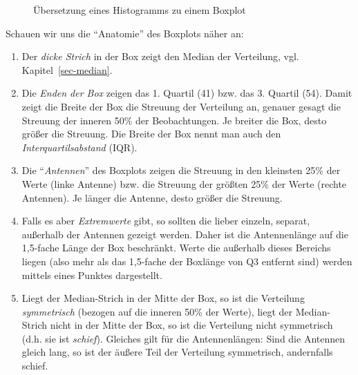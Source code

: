 \documentclass[
  letterpaper,
]{scrbook}
\providecommand{\tightlist}{%
  \setlength{\itemsep}{0pt}\setlength{\parskip}{0pt}}\usepackage{longtable,booktabs,array}
\theoremstyle{definition}
\theoremstyle{definition}
\theoremstyle{definition}
\theoremstyle{remark}
\begin{document}
\begin{figure}[H]


\caption{\label{fig-hist-to-box}Übersetzung eines Histogramms zu einem
Boxplot}

\end{figure}%

Schauen wir uns die \enquote{Anatomie} des Boxplots näher an:

\begin{enumerate}
\def\labelenumi{\arabic{enumi}.}
\tightlist
\item
  Der \emph{dicke Strich} in der Box zeigt den Median der Verteilung,
  vgl. Kapitel~\ref{sec-median}.
\item
  Die \emph{Enden der Box} zeigen das 1. Quartil (41) bzw. das 3.
  Quartil (54). Damit zeigt die Breite der Box die Streuung der
  Verteilung an, genauer gesagt die Streuung der inneren 50\% der
  Beobachtungen. Je breiter die Box, desto größer die Streuung. Die
  Breite der Box nennt man auch den \emph{Interquartilsabstand} (IQR).
\item
  Die \enquote{\emph{Antennen}} des Boxplots zeigen die Streuung in den
  kleinsten 25\% der Werte (linke Antenne) bzw. die Streuung der größten
  25\% der Werte (rechte Antennen). Je länger die Antenne, desto größer
  die Streuung.
\item
  Falls es aber \emph{Extremwerte} gibt, so sollten die lieber einzeln,
  separat, außerhalb der Antennen gezeigt werden. Daher ist die
  Antennenlänge auf die 1,5-fache Länge der Box beschränkt. Werte die
  außerhalb dieses Bereichs liegen (also mehr als das 1,5-fache der
  Boxlänge von Q3 entfernt sind) werden mittels eines Punktes
  dargestellt.
\item
  Liegt der Median-Strich in der Mitte der Box, so ist die Verteilung
  \emph{symmetrisch} (bezogen auf die inneren 50\% der Werte), liegt der
  Median-Strich nicht in der Mitte der Box, so ist die Verteilung nicht
  symmetrisch (d.h. sie ist \emph{schief}). Gleiches gilt für die
  Antennenlängen: Sind die Antennen gleich lang, so ist der äußere Teil
  der Verteilung symmetrisch, andernfalls schief.
\end{enumerate}
\end{document}
